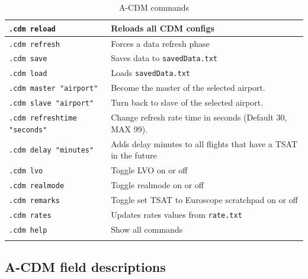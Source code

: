 \documentclass[a4paper,oneside,11pt]{memoir}
\begin{document}
\begin{longtable}{|p{5cm}|p{8.5cm}|}
  \hline
  \texttt{.cdm reload}                 & Reloads all CDM configs\\ \hline
  \texttt{.cdm refresh}                & Forces a data refresh phase\\ \hline
  \texttt{.cdm save}                   & Saves data to \texttt{savedData.txt}\\ \hline
  \texttt{.cdm load}                   & Loads \texttt{savedData.txt}\\ \hline
  \texttt{.cdm master "airport"}       & Become the master of the selected airport.\\ \hline
  \texttt{.cdm slave "airport"}        & Turn back to slave of the selected airport.\\ \hline
  \texttt{.cdm refreshtime "seconds"}  & Change refresh rate time in seconds (Default 30, MAX 99).\\ \hline
  \texttt{.cdm delay "minutes"}        & Adds delay minutes to all flights that have a TSAT in the future\\ \hline
  \texttt{.cdm lvo}                    & Toggle LVO on or off\\ \hline
  \texttt{.cdm realmode}               & Toggle realmode on or off\\ \hline
  \texttt{.cdm remarks}                & Toggle set TSAT to Euroscope scratchpad on or off\\ \hline
  \texttt{.cdm rates}                  & Updates rates values from \texttt{rate.txt}\\ \hline
  \texttt{.cdm help}                   & Show all commands \\ \hline
  \caption{A-CDM commands}
  \label{tab:acdm-commands}
\end{longtable}



\subsection{A-CDM field descriptions}
\end{document}
